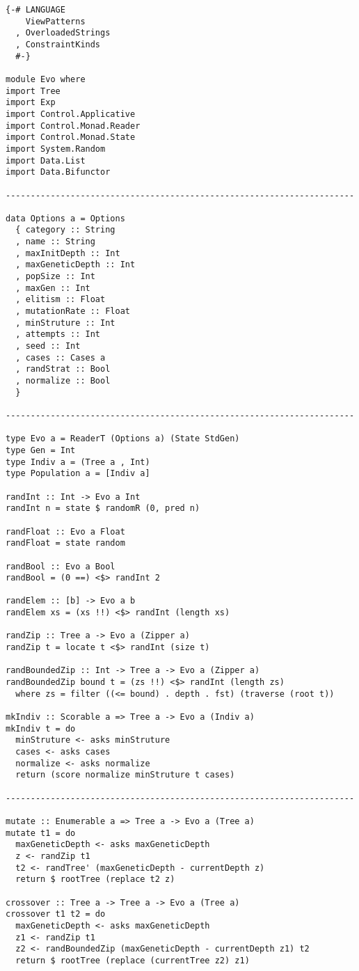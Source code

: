 \documentclass{article}
\begin{document}
\begin{lstlisting}
{-# LANGUAGE
    ViewPatterns
  , OverloadedStrings
  , ConstraintKinds
  #-}

module Evo where
import Tree
import Exp
import Control.Applicative
import Control.Monad.Reader
import Control.Monad.State
import System.Random
import Data.List
import Data.Bifunctor

----------------------------------------------------------------------

data Options a = Options
  { category :: String
  , name :: String
  , maxInitDepth :: Int
  , maxGeneticDepth :: Int
  , popSize :: Int
  , maxGen :: Int
  , elitism :: Float
  , mutationRate :: Float
  , minStruture :: Int
  , attempts :: Int
  , seed :: Int
  , cases :: Cases a
  , randStrat :: Bool
  , normalize :: Bool
  }

----------------------------------------------------------------------

type Evo a = ReaderT (Options a) (State StdGen)
type Gen = Int
type Indiv a = (Tree a , Int)
type Population a = [Indiv a]

randInt :: Int -> Evo a Int
randInt n = state $ randomR (0, pred n)

randFloat :: Evo a Float
randFloat = state random

randBool :: Evo a Bool
randBool = (0 ==) <$> randInt 2

randElem :: [b] -> Evo a b
randElem xs = (xs !!) <$> randInt (length xs)

randZip :: Tree a -> Evo a (Zipper a)
randZip t = locate t <$> randInt (size t)

randBoundedZip :: Int -> Tree a -> Evo a (Zipper a)
randBoundedZip bound t = (zs !!) <$> randInt (length zs)
  where zs = filter ((<= bound) . depth . fst) (traverse (root t))

mkIndiv :: Scorable a => Tree a -> Evo a (Indiv a)
mkIndiv t = do
  minStruture <- asks minStruture
  cases <- asks cases
  normalize <- asks normalize
  return (score normalize minStruture t cases)

----------------------------------------------------------------------

mutate :: Enumerable a => Tree a -> Evo a (Tree a)
mutate t1 = do
  maxGeneticDepth <- asks maxGeneticDepth
  z <- randZip t1
  t2 <- randTree' (maxGeneticDepth - currentDepth z)
  return $ rootTree (replace t2 z)

crossover :: Tree a -> Tree a -> Evo a (Tree a)
crossover t1 t2 = do
  maxGeneticDepth <- asks maxGeneticDepth
  z1 <- randZip t1
  z2 <- randBoundedZip (maxGeneticDepth - currentDepth z1) t2
  return $ rootTree (replace (currentTree z2) z1)


\end{lstlisting}
\end{document}
